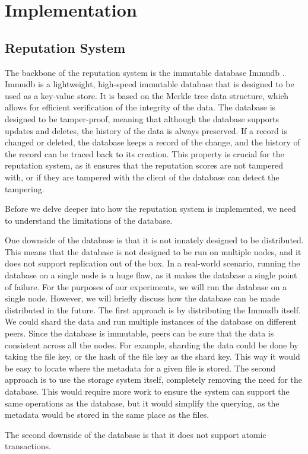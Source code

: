 \chapter{Implementation}
\label{chapter:implementation}

\section{Reputation System}
\label{section:reputation-system}

The backbone of the reputation system is the immutable database Immudb \cite{immudb}.
Immudb is a lightweight, high-speed immutable database that is designed to be used as a key-value store.
It is based on the Merkle tree data structure, which allows for efficient verification of the integrity of the data.
The database is designed to be tamper-proof, meaning that although the database supports updates and deletes,
the history of the data is always preserved.
If a record is changed or deleted,
the database keeps a record of the change, and the history of the record can be traced back to its creation.
This property is crucial for the reputation system, as it ensures that the reputation scores are not tampered with,
or if they are tampered with the client of the database can detect the tampering.

Before we delve deeper into how the reputation system is implemented,
we need to understand the limitations of the database.

One downside of the database is that it is not innately designed to be distributed.
This means that the database is not designed to be run on multiple nodes,
and it does not support replication out of the box.
In a real-world scenario, running the database on a single node is a huge flaw,
as it makes the database a single point of failure.
For the purposes of our experiments, we will run the database on a single node.
However, we will briefly discuss how the database can be made distributed in the future.
The first approach is by distributing the Immudb itself.
We could shard the data and run multiple instances of the database on different peers.
Since the database is immutable, peers can be sure that the data is consistent across all the nodes.
For example, sharding the data could be done by taking the file key, or the hash of the file key as the shard key.
This way it would be easy to locate where the metadata for a given file is stored.
The second approach is to use the storage system itself, completely removing the need for the database.
This would require more work to ensure the system can support the same operations as the database,
but it would simplify the querying, as the metadata would be stored in the same place as the files.

The second downside of the database is that it does not support atomic transactions.

